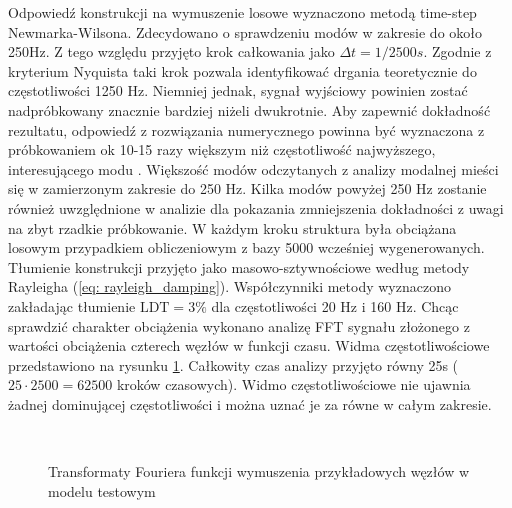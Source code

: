 Odpowiedź konstrukcji na wymuszenie losowe wyznaczono metodą time-step Newmarka-Wilsona. Zdecydowano o sprawdzeniu modów w zakresie do około 250Hz. Z tego względu przyjęto krok całkowania jako $\Delta t = 1/2500 s$. Zgodnie z kryterium Nyquista taki krok pozwala identyfikować drgania teoretycznie do częstotliwości 1250 Hz. Niemniej jednak, sygnał wyjściowy powinien zostać nadpróbkowany znacznie bardziej niżeli dwukrotnie. Aby zapewnić dokładność rezultatu, odpowiedź z rozwiązania numerycznego powinna być wyznaczona z próbkowaniem ok 10-15 razy większym niż częstotliwość najwyższego, interesującego modu \parencite{Zotowski2017c}. Większość modów odczytanych z analizy modalnej mieści się w zamierzonym zakresie do 250 Hz. Kilka modów powyżej 250 Hz zostanie również uwzględnione w analizie dla pokazania zmniejszenia dokładności z uwagi na zbyt rzadkie próbkowanie. W każdym kroku struktura była obciążana losowym przypadkiem obliczeniowym z bazy 5000 wcześniej wygenerowanych. Tłumienie konstrukcji przyjęto jako masowo-sztywnościowe według metody Rayleigha (\ref{eq: rayleigh_damping}). Współczynniki metody wyznaczono zakładając tłumienie $\text{LDT}=3\%$ dla częstotliwości 20 Hz i 160 Hz. Chcąc sprawdzić charakter obciążenia wykonano analizę FFT sygnału złożonego z wartości obciążenia czterech węzłów w funkcji czasu. Widma częstotliwościowe przedstawiono na rysunku \ref{fig: fft_load_input_blue_beam}. Całkowity czas analizy przyjęto równy 25s ($25\cdot2500=62500$ kroków czasowych). Widmo częstotliwościowe nie ujawnia żadnej dominującej częstotliwości i można uznać je za równe w całym zakresie.
\begin{figure}[h]
	\centering
	\\
	\captionsetup{justification=centering}
	\caption{Transformaty Fouriera funkcji wymuszenia przykładowych węzłów w modelu testowym}
	\label{fig: fft_load_input_blue_beam}
\end{figure}

